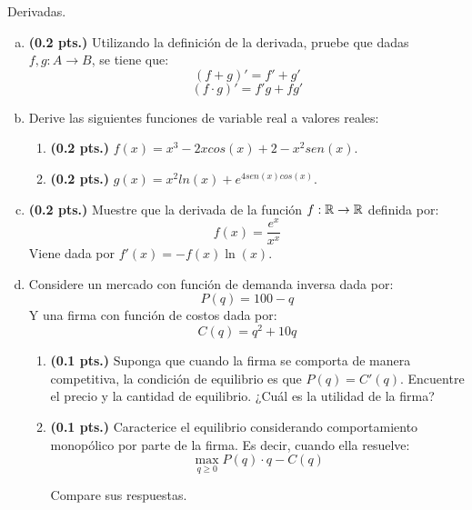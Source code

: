 \begin{problema}{Derivadas.}
	\begin{enumerate}[(a)]
		\item \textbf{(0.2 pts.)} Utilizando la definición de la derivada, pruebe que dadas $f, g: A\rightarrow B$, se tiene que: 
		$$ ( f + g ) ' = f' + g' $$ 
		$$ ( f\cdot g) ' = f' g + f g' $$ 
		
		\item Derive las siguientes funciones de variable real a valores reales: 
		
		\begin{enumerate}
			\item \textbf{(0.2 pts.)} $f(x) = x^3 - 2x cos(x) + 2 - x^2 sen(x)$. 
			
			\item \textbf{(0.2 pts.)} $g(x) = x^2 ln(x) + e^{4sen(x)cos(x)} $.
		\end{enumerate}
		
		\item \textbf{(0.2 pts.)} Muestre que la derivada de la función $f: \mathbb{R} \rightarrow \mathbb{R}$ definida por: 
		$$ f(x) = \dfrac{e^x}{x^x} $$ 
		Viene dada por $ f'(x) = - f(x) \ln (x)$. 
		
		\item Considere un mercado con función de demanda inversa dada por: 
		$$ P(q) = 100 - q $$ 
		Y una firma con función de costos dada por: 
		$$ C(q) = q^2 + 10 q $$ 
		\begin{enumerate}
			\item \textbf{(0.1 pts.)} Suponga que cuando la firma se comporta de manera competitiva, la condición de equilibrio es que $P(q) = C'(q)$.  Encuentre el precio y la cantidad de equilibrio. ¿Cuál es la utilidad de la firma? 
			
			\item \textbf{(0.1 pts.)} Caracterice el equilibrio considerando comportamiento monopólico por parte de la firma. Es decir, cuando ella resuelve: 
			$$ \max _{q \geq 0} P (q) \cdot q - C(q) $$ 
			
			Compare sus respuestas. 
		\end{enumerate}
	\end{enumerate}
\end{problema}


